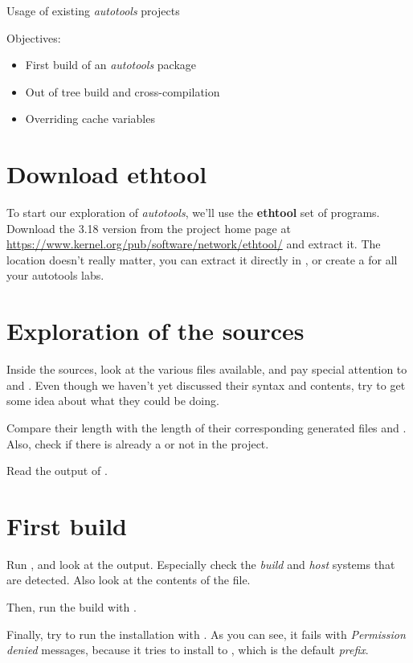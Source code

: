 \subchapter
{Usage of existing {\em autotools} projects}
{Objectives:
  \begin{itemize}
  \item First build of an {\em autotools} package
  \item Out of tree build and cross-compilation
  \item Overriding cache variables
  \end{itemize}
}

\section{Download ethtool}

To start our exploration of {\em autotools}, we'll use the {\bf
  ethtool} set of programs. Download the 3.18 version from the project
home page at
\url{https://www.kernel.org/pub/software/network/ethtool/} and extract
it. The location doesn't really matter, you can extract it directly in
, or create a  for all your
autotools labs.

\section{Exploration of the sources}

Inside the sources, look at the various files available, and pay
special attention to  and . Even
though we haven't yet discussed their syntax and contents, try to get
some idea about what they could be doing.

Compare their length with the length of their corresponding generated
files  and . Also, check if there is
already a  or not in the project.

Read the output of .

\section{First build}

Run , and look at the output. Especially check the
{\em build} and {\em host} systems that are detected. Also look at the
contents of the  file.

Then, run the build with .

Finally, try to run the installation with . As you
can see, it fails with {\em Permission denied} messages, because it
tries to install to , which is the default {\em
  prefix}.

